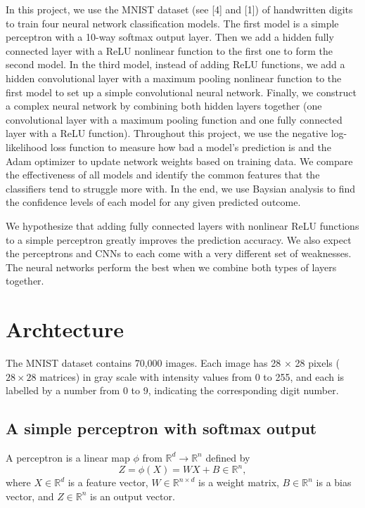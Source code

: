 \documentclass{article}
\begin{document}
In this project, we use the MNIST dataset (see [4] and [1]) of handwritten digits to train four neural network classification models. The first model is a simple perceptron with a 10-way softmax output layer. Then we add a hidden fully connected layer with a ReLU nonlinear function to the first one to form the second model. In the third model, instead of adding ReLU functions, we add a hidden convolutional layer with a maximum pooling nonlinear function to the first model to set up a simple convolutional neural network. Finally, we construct a complex neural network by combining both hidden layers together (one convolutional layer with a maximum pooling function and one fully connected layer with a ReLU function). Throughout this project, we use the negative log-likelihood loss function to measure how bad a model's prediction is and the Adam optimizer to update network weights based on training data.  We compare the effectiveness of all models and identify the common features that the classifiers tend to struggle more with. In the end, we use Baysian analysis to find the confidence levels of each model for any given predicted outcome.

We hypothesize that adding fully connected layers with nonlinear ReLU functions to a simple perceptron greatly improves the prediction accuracy. We also expect the perceptrons and CNNs to each come with a very different set of weaknesses. The neural networks perform the best when we combine both types of layers together.

\section{Archtecture}

The MNIST dataset  contains 70,000 images. Each image has 28 $\times$ 28 pixels ($28\times 28$ matrices) in gray scale with intensity values from 0 to 255, and each is labelled by a number from 0 to 9, indicating the corresponding digit number.

\subsection{A simple perceptron with softmax output}

A perceptron is a linear map $\phi$ from $\mathbb{R}^{d} \to \mathbb{R}^n$ defined by
$$
Z=\phi(X) = WX  + B \in \mathbb{R}^n,
$$
where $X\in \mathbb{R}^{d}$ is a feature vector, $W\in \mathbb{R}^{n\times d}$ is a weight matrix, $B\in \mathbb{R}^n$ is a bias vector, and $Z\in \mathbb{R}^n$ is an output vector.
\end{document}
